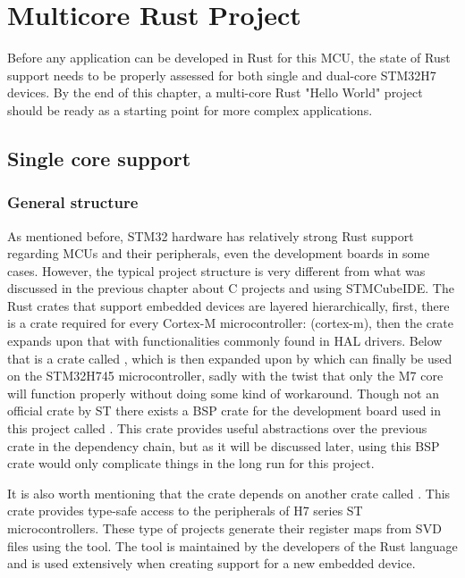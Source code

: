 \chapter{Multicore Rust Project}

Before any application can be developed in Rust for this MCU, the state of Rust support needs to be properly assessed for both single and dual-core STM32H7 devices. By the end of this chapter, a multi-core Rust "Hello World" project should be ready as a starting point for more complex applications.

\section{Single core support}

\subsection{General structure}

As mentioned before, STM32 hardware has relatively strong Rust support regarding MCUs and their peripherals, even the development boards in some cases. However, the typical project structure is very different from what was discussed in the previous chapter about C projects and using STMCubeIDE. The Rust crates that support embedded devices are layered hierarchically, first, there is a crate required for every Cortex-M microcontroller: \mycode(cortex-m), then the  crate expands upon that with functionalities commonly found in HAL drivers. Below that is a crate called , which is then expanded upon by  which can finally be used on the STM32H745 microcontroller, sadly with the twist that only the M7 core will function properly without doing some kind of workaround. Though not an official crate by ST there exists a BSP crate for the development board used in this project called . This crate provides useful abstractions over the previous crate in the dependency chain, but as it will be discussed later, using this BSP crate would only complicate things in the long run for this project.

It is also worth mentioning that the  crate depends on another crate called . This crate provides type-safe access to the peripherals of H7 series ST microcontrollers. These type of projects generate their register maps from SVD files using the  tool. The tool is maintained by the developers of the Rust language and is used extensively when creating support for a new embedded device.

